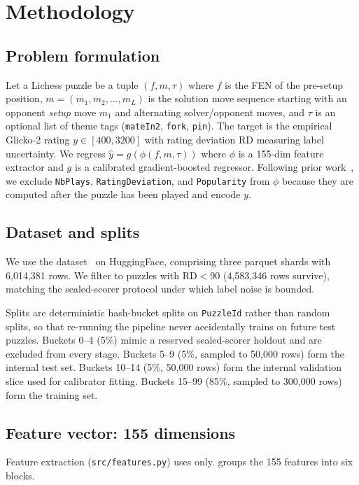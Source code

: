 \section{Methodology}
\label{sec:method}

\subsection{Problem formulation}
Let a Lichess puzzle be a tuple $(f, m, \tau)$ where $f$ is the FEN of the pre-setup position, $m = (m_1, m_2, \ldots, m_L)$ is the solution move sequence starting with an opponent \emph{setup} move $m_1$ and alternating solver/opponent moves, and $\tau$ is an optional list of theme tags (\eg \texttt{mateIn2}, \texttt{fork}, \texttt{pin}). The target is the empirical Glicko-2 rating $y \in [400, 3200]$ with rating deviation $\text{RD}$ measuring label uncertainty. We regress $\hat{y} = g(\phi(f, m, \tau))$ where $\phi$ is a 155-dim feature extractor and $g$ is a calibrated gradient-boosted regressor. Following prior work~\citep{milosz2024glickformer}, we exclude \texttt{NbPlays}, \texttt{RatingDeviation}, and \texttt{Popularity} from $\phi$ because they are computed after the puzzle has been played and encode $y$.

\subsection{Dataset and splits}
\label{sec:data}
We use the \lichesspuzzles dataset~\citep{lichesspuzzles} on HuggingFace, comprising three parquet shards with 6{,}014{,}381 rows. We filter to puzzles with $\text{RD} < 90$ (4{,}583{,}346 rows survive), matching the sealed-scorer protocol under which label noise is bounded.

Splits are deterministic hash-bucket splits on \texttt{PuzzleId} rather than random splits, so that re-running the pipeline never accidentally trains on future test puzzles. Buckets 0--4 (5\%) mimic a reserved sealed-scorer holdout and are excluded from every stage. Buckets 5--9 (5\%, sampled to 50{,}000 rows) form the internal test set. Buckets 10--14 (5\%, 50{,}000 rows) form the internal validation slice used for calibrator fitting. Buckets 15--99 (85\%, sampled to 300{,}000 rows) form the training set.

\subsection{Feature vector: 155 dimensions}
\label{sec:features}
Feature extraction (\texttt{src/features.py}) uses \pychess only.  groups the 155 features into six blocks.


